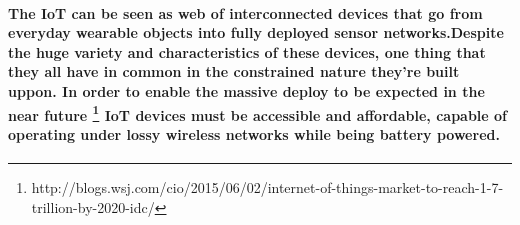 \paragraph{
The \ac{IoT} can be seen as web of interconnected devices that go from everyday wearable objects into fully deployed sensor networks.Despite the huge variety and characteristics of these devices, one thing that they all have in common in the constrained nature they're built uppon. In order to enable the massive deploy to be expected in the near future \footnote{http://blogs.wsj.com/cio/2015/06/02/internet-of-things-market-to-reach-1-7-trillion-by-2020-idc/} \ac{IoT} devices must be accessible and affordable, capable of operating under lossy wireless networks while being battery powered.
}
